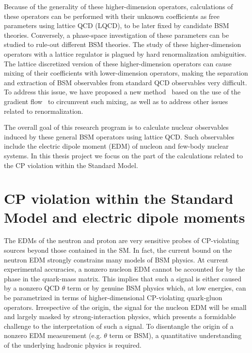 \documentclass[aps,prc,twocolumn,showpacs,floatfix,nofootinbib,preprintnumbers,superscriptaddress,amsmath,amssymb]{revtex4-1}
\begin{document}
Because of the generality of these higher-dimension operators, 
calculations of these operators can be performed with their unknown coefficients as free parameters using lattice QCD (LQCD), 
to be later fixed by candidate BSM theories.  
Conversely, a phase-space investigation of these parameters can be studied to rule-out different BSM theories.  
The study of these higher-dimension operators with a lattice regulator is plagued by 
hard renormalization ambiguities. 
The lattice discretized version of these higher-dimension operators can cause mixing of their coefficients 
with lower-dimension operators, making the separation and extraction of BSM observables from standard QCD observables very difficult.  
To address this issue, we have proposed a new method~\cite{Shindler:2014oha,Shindler:2015aqa} 
based on the use of the gradient flow~\cite{Luscher:2010iy,Luscher:2013cpa} 
to circumvent such mixing, as well as to address other issues related to renormalization.

The overall goal of this research program is to calculate nuclear observables induced by these general BSM operators using lattice QCD.  
Such observables include the electric dipole moment (EDM) of nucleon and few-body nuclear systems. 
In this thesis project we focus on the part of the calculations related to the
CP violation within the Standard Model. 


\section*{CP violation within the Standard Model and electric dipole moments}
The EDMs of the neutron and proton are very sensitive probes of CP-violating sources 
beyond those contained in the SM.
In fact, the current bound on the neutron EDM strongly constrains many models of BSM physics. 
At current experimental accuracies, a nonzero nucleon EDM cannot be accounted for by the phase 
in the quark-mass matrix. 
This implies that such a signal is either caused by a nonzero QCD $\theta$ term or 
by genuine BSM physics which, at low energies, 
can be parametrized in terms of higher-dimensional CP-violating quark-gluon operators. 
Irrespective of the origin, the signal for the nucleon EDM will be small and largely 
masked by strong-interaction physics, which presents a formidable challenge to the interpretation
of such a signal.
To disentangle the origin of a nonzero EDM measurement (e.g. $\theta$ term or BSM), 
a quantitative understanding of the underlying hadronic physics is required.
\end{document}
